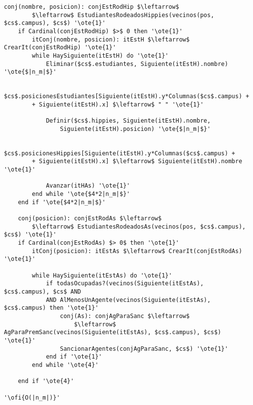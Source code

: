 \begin{lstlisting}[mathescape]
	conj(nombre, posicion): conjEstRodHip $\leftarrow$
		$\leftarrow$ EstudiantesRodeadosHippies(vecinos(pos, $cs$.campus), $cs$) '\ote{1}'
	if Cardinal(conjEstRodHip) $>$ 0 then '\ote{1}'
		itConj(nombre, posicion): itEstH $\leftarrow$ CrearIt(conjEstRodHip) '\ote{1}'	
		while HaySiguiente(itEstH) do '\ote{1}'
			Eliminar($cs$.estudiantes, Siguiente(itEstH).nombre) '\ote{$|n_m|$}'
			
			$cs$.posicionesEstudiantes[Siguiente(itEstH).y*Columnas($cs$.campus) +
		+ Siguiente(itEstH).x] $\leftarrow$ " " '\ote{1}'

			Definir($cs$.hippies, Siguiente(itEstH).nombre, 
				Siguiente(itEstH).posicion) '\ote{$|n_m|$}'
			
			$cs$.posicionesHippies[Siguiente(itEstH).y*Columnas($cs$.campus) +
		+ Siguiente(itEstH).x] $\leftarrow$ Siguiente(itEstH).nombre '\ote{1}'
		
			Avanzar(itHAs) '\ote{1}'
		end while '\ote{$4*2|n_m|$}'
	end if '\ote{$4*2|n_m|$}'

	conj(posicion): conjEstRodAs $\leftarrow$
		$\leftarrow$ EstudiantesRodeadosAs(vecinos(pos, $cs$.campus), $cs$) '\ote{1}'
	if Cardinal(conjEstRodAs) $> 0$ then '\ote{1}'
		itConj(posicion): itEstAs $\leftarrow$ CrearIt(conjEstRodAs) '\ote{1}'
		
		while HaySiguiente(itEstAs) do '\ote{1}'
			if todasOcupadas?(vecinos(Siguiente(itEstAs), $cs$.campus), $cs$ AND 
			AND AlMenosUnAgente(vecinos(Siguiente(itEstAs), $cs$.campus) then '\ote{1}'
				conj(As): conjAgParaSanc $\leftarrow$ 
					$\leftarrow$ AgParaPremSanc(vecinos(Siguiente(itEstAs), $cs$.campus), $cs$) '\ote{1}'
				SancionarAgentes(conjAgParaSanc, $cs$) '\ote{1}'
			end if '\ote{1}'
		end while '\ote{4}'

	end if '\ote{4}'
	
'\ofi{O(|n_m|)}'


\end{lstlisting}


